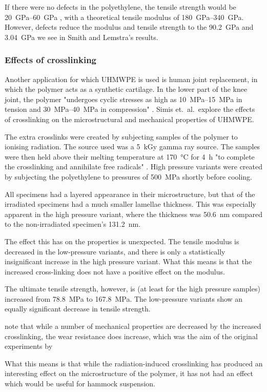 If there were no defects in the polyethylene, the tensile strength would be \SIrange{20}{60}{\giga\pascal} , with a theoretical tensile modulus of \SIrange{180}{340}{\giga\pascal}. However, defects reduce the modulus and tensile strength to the \SI{90.2}{\giga\pascal} and \SI{3.04}{\giga\pascal} we see in Smith and Lemstra's results. 

\subsubsection{Effects of crosslinking}
Another application for which UHMWPE is used is  human joint replacement, in which the polymer acts as a synthetic cartilage. In the lower part of the knee joint, the polymer "undergoes cyclic stresses as high as \SIrange{10}{15}{\mega\pascal} in tension and \SIrange{30}{40}{\mega\pascal} in compression" . Simis et.\ al.\ explore the effects of crosslinking on the microstructural and mechanical properties of UHMWPE.

The extra crosslinks were created by subjecting samples of the polymer to ionising radiation. The source used was a \SI{5}{\kilo\gray} gamma ray source. The samples were then held above their melting temperature at \SI{170}{\celsius} for \SI{4}{\hour} "to complete the crosslinking and annihilate free radicals" . High pressure variants were created by subjecting the polyethylene to pressures of \SI{500}{\mega\pascal} shortly before cooling.

All specimens had a layered appearance in their microstructure, but that of the irradiated specimens had a much smaller lamellae thickness. This was especially apparent in the high pressure variant, where the thickness was \SI{50.6}{\nano\metre} compared to the non-irradiated specimen's \SI{131.2}{\nano\metre}.

The effect this has on the properties is unexpected. The tensile modulus is decreased in the low-pressure variants, and there is only a statistically insignificant increase in the high pressure variant. What this means is that the increased cross-linking does not have a positive effect on the modulus.

The ultimate tensile strength, however, is (at least for the high pressure samples) increased from \SI{78.8}{\mega\pascal} to \SI{167.8}{\mega\pascal}. The low-pressure variants show an equally significant decrease in tensile strength.

\cite{muratoglu_unified_1999} note that while a number of mechanical properties are decreased by the increased crosslinking, the wear resistance does increase, which was the aim of the original experiments by \cite{simis_combined_2006}

What this means is that while the radiation-induced crosslinking has produced an interesting effect on the microstructure of the polymer, it has not had an effect which would be useful for hammock suspension.
